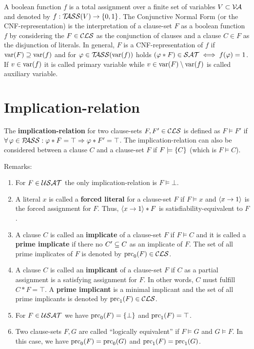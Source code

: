 \documentclass{report}
\begin{document}
A boolean function $f$ is a total assignment over a finite set of variables $V \subset \mathcal{V\hspace{-0.1em}A}$ and denoted by $f:  \mathcal{T\hspace{-0.35em}ASS}(V) \rightarrow \{ 0,1 \}$. The Conjunctive Normal Form (or the CNF-representation) is the interpretation of a clause-set $F$ as a boolean function $f$ by considering the $F \in \mathcal{CLS}$ as the conjunction of clauses and a clause $C \in F$ as the disjunction of literals. In general, $F$ is a CNF-representation of $f$ if $\operatorname{var}(F) \supseteq \operatorname{var}(f)$ and for $\varphi \in \mathcal{T\hspace{-0.35em}ASS}(\operatorname{var}(f))$ holds $(\varphi * F) \in \mathcal{SAT} \iff f(\varphi) = 1$. If $v \in \operatorname{var}(f)$ it is called primary variable while $v \in \operatorname{var}(F) \setminus \operatorname{var}(f)$ is called auxiliary variable.

\section{Implication-relation}
\label{sec:imprel}

\begin{defi}\label{def:imp-rel}
The \textbf{implication-relation} for two clause-sets $F, F' \in \mathcal{CLS}$ is defined as $F \models F'$ if $\forall\, \varphi \in \mathcal{P\hspace{-0.32em}ASS} : \varphi * F = \top \Rightarrow \varphi * F' = \top$. The implication-relation can also be considered between a clause $C$ and a clause-set $F$ if $F \models \{ C \}$ (which is $F \models C$).
\end{defi}
Remarks:
  \begin{enumerate}
  \item For  $F \in \mathcal{USAT}$ the only implication-relation is $F \models \bot$.
  \item A literal $x$ is called a \textbf{forced literal} for a clause-set $F$ if $F \models x$ and $\langle x \rightarrow 1 \rangle$ is the forced assignment for $F$. Thus,  $\langle x \rightarrow 1 \rangle * F$ is satisfiability-equivalent to $F$.
  \item A clause $C$ is called an \textbf{implicate} of a clause-set $F$ if $F \models C$ and it is called a \textbf{prime implicate} if there no $ C' \subseteq C$ as an implicate of $F$. The set of all prime implicates of $F$ is denoted by $\operatorname{prc}_0(F) \in \mathcal{CLS}$.
  \item A clause $C$ is called an \textbf{implicant} of a clause-set $F$ if $C$ as a partial assignment is a satisfying assignment for $F$. In other words, $C$ must fulfill $C * F=\top$. A \textbf{prime implicant} is a minimal implicant and the set of all prime implicants is denoted by $\operatorname{prc}_1(F) \in \mathcal{CLS}$. 
  \item For $F \in \mathcal{USAT}$ we have $\operatorname{prc}_0(F) = \{ \bot \}$ and $\operatorname{prc}_1(F) = \top$.
  \item Two clause-sets $F, G$ are called ``logically equivalent'' if $F \models G$ and $G \models F$. In this case, we have $\operatorname{prc}_0(F) = \operatorname{prc}_0(G)$ and $\operatorname{prc}_1(F) = \operatorname{prc}_1(G)$.
  \end{enumerate}
\end{document}
